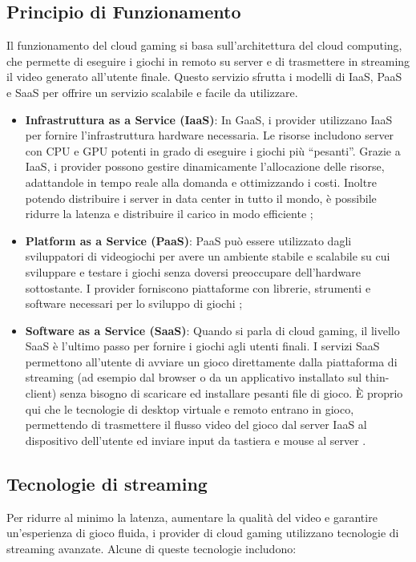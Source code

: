 \documentclass[12pt,a4paper,openright,twoside]{book}
\begin{document}
\subsection{Principio di Funzionamento}
\label{subsec:funzionamento}

Il funzionamento del cloud gaming si basa sull'architettura del cloud computing, che permette di eseguire i giochi in remoto su server e di trasmettere in streaming il video generato all'utente finale. Questo servizio sfrutta i modelli di \ac{IaaS}, PaaS e SaaS per offrire un servizio scalabile e facile da utilizzare.

\begin{itemize}
    \item \textbf{Infrastruttura as a Service (IaaS)}: In GaaS, i provider utilizzano \ac{IaaS} per fornire l'infrastruttura hardware necessaria. Le risorse includono server con CPU e GPU potenti in grado di eseguire i giochi più ``pesanti''. Grazie a IaaS, i provider possono gestire dinamicamente l'allocazione delle risorse, adattandole in tempo reale alla domanda e ottimizzando i costi. Inoltre potendo distribuire i server in data center in tutto il mondo, è possibile ridurre la latenza e distribuire il carico in modo efficiente \cite{HARLE2023};
    \item \textbf{Platform as a Service (PaaS)}: PaaS può essere utilizzato dagli sviluppatori di videogiochi per avere un ambiente stabile e scalabile su cui sviluppare e testare i giochi senza doversi preoccupare dell'hardware sottostante. I provider forniscono piattaforme con librerie, strumenti e software necessari per lo sviluppo di giochi \cite{HARLE2023};
    \item \textbf{Software as a Service (SaaS)}: Quando si parla di cloud gaming, il livello SaaS è l'ultimo passo per fornire i giochi agli utenti finali. I servizi SaaS permettono all'utente di avviare un gioco direttamente dalla piattaforma di streaming (ad esempio dal browser o da un applicativo installato sul thin-client) senza bisogno di scaricare ed installare pesanti file di gioco. È proprio qui che le tecnologie di desktop virtuale e remoto entrano in gioco, permettendo di trasmettere il flusso video del gioco dal server IaaS al dispositivo dell'utente ed inviare input da tastiera e mouse al server \cite{HARLE2023}.
\end{itemize}

\subsection{Tecnologie di streaming}
\label{subsec:streaming-tech}
Per ridurre al minimo la latenza, aumentare la qualità del video e garantire un'esperienza di gioco fluida, i provider di cloud gaming utilizzano tecnologie di streaming avanzate.
Alcune di queste tecnologie includono:
\end{document}
